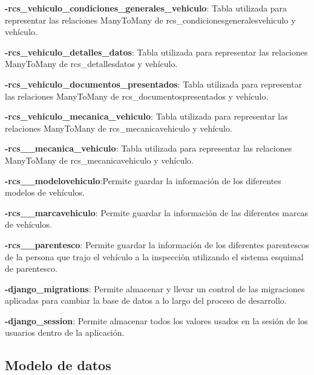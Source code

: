 \textbf{-rcs\_vehiculo\_condiciones\_generales\_vehiculo}: Tabla utilizada para representar las relaciones ManyToMany de rcs\_condicionesgeneralesvehiculo y vehículo.

\textbf{-rcs\_vehiculo\_detalles\_datos}: Tabla utilizada para representar las relaciones ManyToMany de rcs\_detallesdatos y vehículo.

\textbf{-rcs\_vehiculo\_documentos\_presentados}: Tabla utilizada para representar las relaciones ManyToMany de rcs\_documentospresentados y vehículo.

\textbf{-rcs\_vehiculo\_mecanica\_vehiculo}: Tabla utilizada para representar las relaciones ManyToMany de rcs\_mecanicavehiculo y vehículo.

\textbf{-rcs\_\_mecanica\_vehiculo}: Tabla utilizada para representar las relaciones ManyToMany de rcs\_mecanicavehiculo y vehículo.

\textbf{-rcs\_\_modelovehiculo}:Permite guardar la información de los diferentes modelos de vehículos.

\textbf{-rcs\_\_marcavehiculo}: Permite guardar la información de las diferentes marcas de vehículos.

\textbf{-rcs\_\_parentesco}: Permite guardar la información de los diferentes parentescos de la persona que trajo el vehículo a la inspección utilizando el sistema esquimal de parentesco.

\textbf{-django\_migrations}: Permite almacenar y llevar un control de las migraciones aplicadas para cambiar la base de datos a lo largo del proceso de desarrollo.

\textbf{-django\_session}: Permite almacenar todos los valores usados en la sesión de los usuarios dentro de la aplicación.

\setlength{\parskip}{0mm}

\newpage


\subsection{Modelo de datos}
\setlength{\parskip}{5mm}

